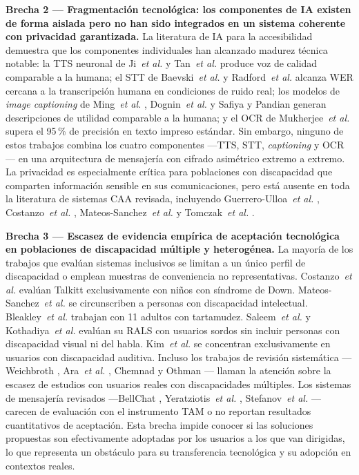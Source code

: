 \documentclass[journal]{IEEEtran}
\begin{document}
	\textbf{Brecha 2 --- Fragmentaci\'on tecnol\'ogica: los componentes de IA existen de forma aislada pero no han sido integrados en un sistema coherente con privacidad garantizada.} La literatura de IA para la accesibilidad demuestra que los componentes individuales han alcanzado madurez t\'ecnica notable: la TTS neuronal de Ji~\textit{et al.} \cite{ji2024} y Tan~\textit{et al.} \cite{tan2021} produce voz de calidad comparable a la humana; el STT de Baevski~\textit{et al.} \cite{baevski2020} y Radford~\textit{et al.} \cite{radford2023} alcanza WER cercana a la transcripci\'on humana en condiciones de ruido real; los modelos de \textit{image captioning} de Ming~\textit{et al.} \cite{ming2022}, Dognin~\textit{et al.} \cite{dognin2021} y Safiya y Pandian \cite{safiya2024} generan descripciones de utilidad comparable a la humana; y el OCR de Mukherjee~\textit{et al.} \cite{mukherjee2023} supera el 95\,\% de precisi\'on en texto impreso est\'andar. Sin embargo, ninguno de estos trabajos combina los cuatro componentes ---TTS, STT, \textit{captioning} y OCR--- en una arquitectura de mensajer\'ia con cifrado asim\'etrico extremo a extremo. La privacidad es especialmente cr\'itica para poblaciones con discapacidad que comparten informaci\'on sensible en sus comunicaciones, pero est\'a ausente en toda la literatura de sistemas CAA revisada, incluyendo Guerrero-Ulloa~\textit{et al.} \cite{guerrero2021bellchat}, Costanzo~\textit{et al.} \cite{costanzo2023}, Mateos-Sanchez~\textit{et al.} \cite{mateos2022} y Tomczak~\textit{et al.} \cite{tomczak2021}.
	
	\textbf{Brecha 3 --- Escasez de evidencia emp\'irica de aceptaci\'on tecnol\'ogica en poblaciones de discapacidad m\'ultiple y heterog\'enea.} La mayor\'ia de los trabajos que eval\'uan sistemas inclusivos se limitan a un \'unico perfil de discapacidad o emplean muestras de conveniencia no representativas. Costanzo~\textit{et al.} \cite{costanzo2023} eval\'uan Talkitt exclusivamente con ni\~nos con s\'indrome de Down. Mateos-Sanchez~\textit{et al.} \cite{mateos2022} se circunscriben a personas con discapacidad intelectual. Bleakley~\textit{et al.} \cite{bleakley2022} trabajan con 11 adultos con tartamudez. Saleem~\textit{et al.} \cite{saleem2023} y Kothadiya~\textit{et al.} \cite{kothadiya2022} eval\'uan su RALS con usuarios sordos sin incluir personas con discapacidad visual ni del habla. Kim~\textit{et al.} \cite{kim2024} se concentran exclusivamente en usuarios con discapacidad auditiva. Incluso los trabajos de revisi\'on sistem\'atica ---Weichbroth \cite{weichbroth2020}, Ara~\textit{et al.} \cite{ara2024}, Chemnad y Othman \cite{chemnad2024}--- llaman la atenci\'on sobre la escasez de estudios con usuarios reales con discapacidades m\'ultiples. Los sistemas de mensajer\'ia revisados ---BellChat \cite{guerrero2021bellchat}, Yeratziotis~\textit{et al.} \cite{yeratziotis2023}, Stefanov~\textit{et al.} \cite{stefanov2024}--- carecen de evaluaci\'on con el instrumento TAM o no reportan resultados cuantitativos de aceptaci\'on. Esta brecha impide conocer si las soluciones propuestas son efectivamente adoptadas por los usuarios a los que van dirigidas, lo que representa un obst\'aculo para su transferencia tecnol\'ogica y su adopci\'on en contextos reales.
	
\end{document}
